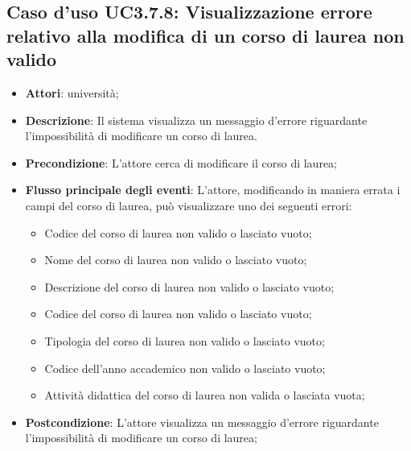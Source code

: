 \subsection{Caso d'uso \texorpdfstring{UC3.7.8}{UC3.7.8}: Visualizzazione errore relativo alla modifica di un corso di laurea non valido}
\begin{itemize}
\item \textbf{Attori}: università;
\item \textbf{Descrizione}: Il sistema visualizza un messaggio d'errore riguardante l'impossibilità di modificare un corso di laurea.

\item \textbf{Precondizione}: L'attore cerca di modificare il corso di laurea;

\item \textbf{Flusso principale degli eventi}: L'attore, modificando in maniera errata i campi del corso di laurea, può visualizzare uno dei seguenti errori: \begin{itemize} \item Codice del corso di laurea non valido o lasciato vuoto; \item Nome del corso di laurea non valido o lasciato vuoto; \item Descrizione del corso di laurea non valido o lasciato vuoto; \item Codice del corso di laurea non valido o lasciato vuoto; \item Tipologia del corso di laurea non valido o lasciato vuoto; \item Codice dell'anno accademico non valido o lasciato vuoto; \item Attività didattica del corso di laurea non valida o lasciata vuota; \end{itemize}
\item \textbf{Postcondizione}: L'attore visualizza un messaggio d'errore riguardante l'impossibilità di modificare un corso di laurea;


\end{itemize}
